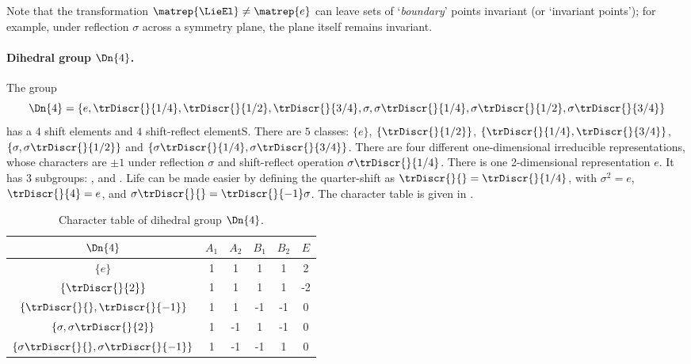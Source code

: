 \begin{description}
Note that the {\statesp} transformation $\matrep{\LieEl} \neq \matrep{e}$
can leave sets of `{\em boundary}' points  invariant (or `invariant
points'); for example, under reflection
$\sigma$ across a symmetry plane, the plane itself remains invariant.

\paragraph{Dihedral group $\Dn{4}$.}
\label{exam:D4chars}
The   group
\[\Dn{4}=\{e,\trDiscr{}{1/4},\trDiscr{}{1/2},\trDiscr{}{3/4},
           \sigma,\sigma\trDiscr{}{1/4},
           \sigma\trDiscr{}{1/2},\sigma\trDiscr{}{3/4} \}
\]
has a
$4$ shift elements and $4$ shift-reflect elementS.
There are $5$ classes:
$\{e\}$,
$\{\trDiscr{}{1/2}\}$,
$\{\trDiscr{}{1/4},\trDiscr{}{3/4}\}$,
$\{\sigma,\sigma\trDiscr{}{1/2}\}$ and
$\{\sigma\trDiscr{}{1/4},\sigma\trDiscr{}{3/4}\}$.
There are four different one-dimensional irreducible representations,
whose characters are $\pm 1$ under reflection $\sigma$ and shift-reflect
operation $\sigma\trDiscr{}{1/4}$.
There is one 2-dimensional representation $e$.
It has 3 subgroups:  ,   and  .
Life can be made easier by defining the quarter-shift as
$\trDiscr{}{} = \trDiscr{}{1/4}$,
with $\sigma^2=e$, $\trDiscr{}{4}=e$, and
$\sigma\trDiscr{}{}=\trDiscr{}{-1}\sigma$.
The character table is given in .

\begin{table}
\begin{center}
\begin{tabular}{c|ccccc}
$\Dn{4}$       & $A_1$& $A_2$& $B_1$& $B_2$& $E$ \\
\hline
$\{e\}$        &   1  &   1  &  1   &  1  &  2  \\
$\{\trDiscr{}{2}\}$
               &   1  &   1  &  1   &  1  & -2 \\
$\{\trDiscr{}{},\trDiscr{}{-1}\}$
               &   1  &   1  & -1   & -1  &  0  \\
$\{\sigma,\sigma\trDiscr{}{2}\}$
               &   1  &  -1  &  1   & -1  &  0  \\
$\{\sigma\trDiscr{}{},\sigma\trDiscr{}{-1}\}$
               &   1  &  -1  &  -1  & 1   &  0
\end{tabular}
\end{center}
  \caption{\label{tab:D4char}
Character table of dihedral group $\Dn{4}$.
  }
\end{table}


\end{description}
